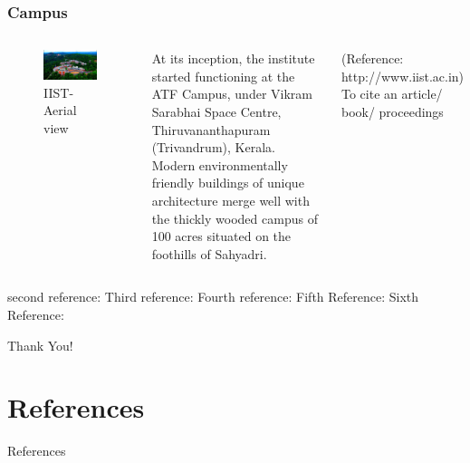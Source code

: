 \documentclass[hyperref={bookmarks=false},aspectratio=169]{beamer}
\begin{document}
\begin{frame}
\frametitle{Campus}

\begin{columns}


\begin{figure}
    \centering
    \includegraphics[width=\columnwidth]{./figures/iist}
    \caption{IIST- Aerial view}
    \label{fig:hollywood_prank}
\end{figure}


At its inception, the institute started functioning at the ATF Campus, under Vikram Sarabhai Space Centre, Thiruvananthapuram (Trivandrum), Kerala. Modern environmentally friendly buildings of unique architecture merge well with the thickly wooded campus of 100 acres situated on the foothills of Sahyadri.

\small{(Reference: http://www.iist.ac.in)}\\
To cite an article/ book/ proceedings


\end{columns}
\cite{santhosh2021generalized} second reference: \cite{ROMANO201714} Third reference:\cite{ROMANO2017151} Fourth reference: \cite{Strogatz1991} Fifth Reference: \cite{strogatz2004sync} Sixth Reference:\cite{thomson1996theory}
\end{frame}
\begin{thankyouframe}[plain]
	\centering
	\Huge Thank You!
\end{thankyouframe}

\section{References}
\begin{frame}[allowframebreaks]{References}

	
	
	
\end{frame}
\end{document}
